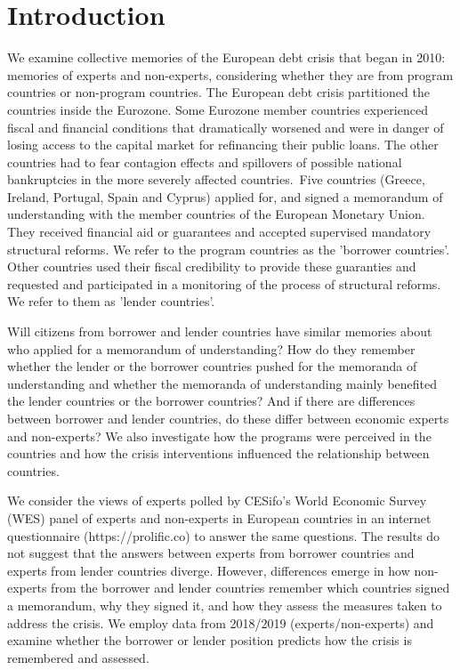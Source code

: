 \section{Introduction}

We examine collective memories of the European debt crisis that
began in 2010: memories of experts and non-experts, considering whether they are from program countries or non-program countries.
The European debt crisis partitioned the countries inside the Eurozone. Some
Eurozone member countries experienced fiscal and financial conditions that
dramatically worsened and were in danger of losing access to the capital
market for refinancing their public loans. The other countries had to
fear contagion effects and spillovers of possible national
bankruptcies in the more severely affected countries.\ Five countries
(Greece, Ireland, Portugal, Spain and Cyprus) applied for, and signed a
memorandum of understanding with the member countries of the European
Monetary Union. They received financial aid or
guarantees and accepted supervised mandatory structural reforms. We refer to the program
countries as the 'borrower countries'. Other countries used their fiscal credibility to provide these guaranties and requested
and participated in a monitoring of the process of structural reforms. We
refer to them as 'lender countries'.

Will citizens from borrower and lender countries have similar memories about who
applied for a memorandum of understanding? How do they remember
whether the lender or the borrower countries pushed for the memoranda of understanding and whether
the memoranda of understanding mainly benefited the lender countries or the
borrower countries? And if there are differences between borrower and lender countries, do these differ between economic experts and non-experts? We also
investigate how the programs were perceived in the countries
and how the crisis interventions influenced the relationship between
countries.\ 

We consider the views of experts polled by CESifo's World Economic Survey (WES) panel of experts and non-experts in European countries in an internet questionnaire (https://prolific.co) to answer the same questions. The results do not suggest that the answers between experts from borrower countries and experts from lender countries diverge. However, differences emerge in how non-experts from the borrower and lender countries remember which countries signed a memorandum, why they signed it, and how they assess the measures taken to address the crisis. We employ data from 2018/2019 (experts/non-experts) and examine whether the borrower or lender position predicts how the crisis is remembered and assessed. 

